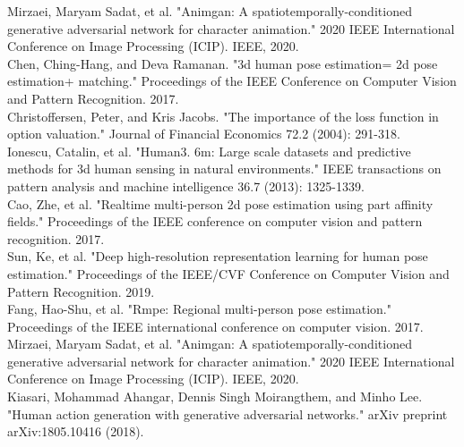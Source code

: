 \begin{thebibliography}{9}
Mirzaei, Maryam Sadat, et al. "Animgan: A spatiotemporally-conditioned generative adversarial network for character animation." 2020 IEEE International Conference on Image Processing (ICIP). IEEE, 2020.\\

Chen, Ching-Hang, and Deva Ramanan. "3d human pose estimation= 2d pose estimation+ matching." Proceedings of the IEEE Conference on Computer Vision and Pattern Recognition. 2017.\\

Christoffersen, Peter, and Kris Jacobs. "The importance of the loss function in option valuation." Journal of Financial Economics 72.2 (2004): 291-318.\\

Ionescu, Catalin, et al. "Human3. 6m: Large scale datasets and predictive methods for 3d human sensing in natural environments." IEEE transactions on pattern analysis and machine intelligence 36.7 (2013): 1325-1339.\\

Cao, Zhe, et al. "Realtime multi-person 2d pose estimation using part affinity fields." Proceedings of the IEEE conference on computer vision and pattern recognition. 2017.\\

Sun, Ke, et al. "Deep high-resolution representation learning for human pose estimation." Proceedings of the IEEE/CVF Conference on Computer Vision and Pattern Recognition. 2019.\\

Fang, Hao-Shu, et al. "Rmpe: Regional multi-person pose estimation." Proceedings of the IEEE international conference on computer vision. 2017.\\

Mirzaei, Maryam Sadat, et al. "Animgan: A spatiotemporally-conditioned generative adversarial network for character animation." 2020 IEEE International Conference on Image Processing (ICIP). IEEE, 2020.\\

Kiasari, Mohammad Ahangar, Dennis Singh Moirangthem, and Minho Lee. "Human action generation with generative adversarial networks." arXiv preprint arXiv:1805.10416 (2018).\\


\end{thebibliography}
